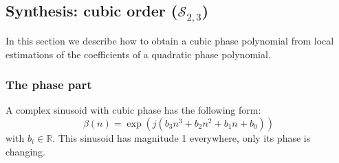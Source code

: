 \subsection{Synthesis: cubic order ($\mathscr{S}_{2,3}$)
\label{sec:s23synthesis}}

In this section we describe how to obtain a cubic phase polynomial from
local estimations of the coefficients of a quadratic phase polynomial.

\subsubsection{The phase part}

A complex sinusoid with cubic phase has the following form:
\begin{equation}
    \label{eq:cubicphasepoly}
    \beta(n) = \exp \left(j\left(b_3 n^{3} + b_2 n^{2} + b_1 n + b_0
        \right)\right)
\end{equation}
with $b_{i} \in \mathbb{R}$. This sinusoid has magnitude 1 everywhere, only its
phase is changing.

